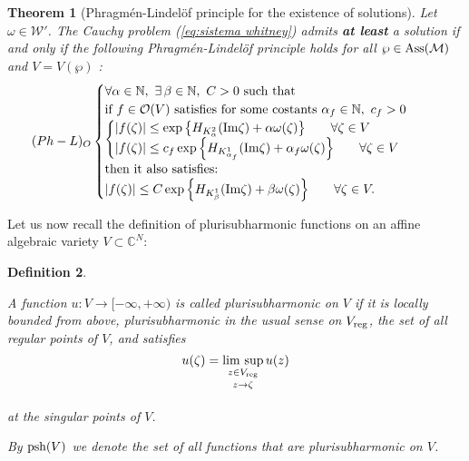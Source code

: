 \documentclass[twoside]{amsart}
\newtheorem{Th}{Theorem}[section]
\newtheorem{Def}[Th]{Definition}
\begin{document}
\begin{Th}[Phragm\'en-Lindel\"of principle for the existence
of solutions]
  \label{thm:3.4.8}
  Let $\omega\in{\mathcal{W}}'$.
The Cauchy pro\-blem (\ref{eq:sistema whitney}) admits \textbf{at least}
a solution if and only if the following Phragm\'en-Lindel\"{o}f principle
holds for all $\wp\in{\mathop{\rm Ass}\nolimits}({\mathcal{M}})$ and $V=V(\wp)$ :
\begin{align*}
(Ph-L)_{O} & 
\begin{cases}
\forall\alpha\in{\mathbb N},\,\,\exists\,\beta\in{\mathbb N},\,\,C>0\,\,\mbox{such that} 
& \mbox{}\\
\mbox{if }f\in{\mathcal O}(V)\,\,\mbox{satisfies for some costants }
\alpha_{f}\in{\mathbb N},\,\,c_{f}>0\\
\begin{cases}
|f(\zeta)|\leq\exp\left\{ H_{K_{\alpha}^{2}}({\mathop{\rm Im}\nolimits}\zeta)+\alpha\omega(\zeta)
\right\} \,\,\,\,\,\,\,\,\,\,\,\forall\zeta\in V\\
|f(\zeta)|\leq c_{f}\exp\left\{ H_{K_{\alpha_{f}}^{1}}({\mathop{\rm Im}\nolimits}\zeta)+\alpha_{f}
\omega(\zeta)\right\} \,\,\,\,\,\,\,\,\,\,\,\forall\zeta\in V
\end{cases}\\
\mbox{then it also satisfies:}\\
|f(\zeta)|\leq C\exp\left\{ H_{K_{\beta}^{1}}({\mathop{\rm Im}\nolimits}\zeta)+\beta\omega(\zeta)
\right\} \,\,\,\,\,\,\,\,\,\,\,\forall\zeta\in V.
\end{cases}
\end{align*}
\end{Th}

Let us now recall the definition of plurisubharmonic functions on
an affine algebraic variety $V\subset\mathbb{C}^{N}:$
\begin{Def}
\label{defpsh}
\begin{em}
A function $u:V\rightarrow[-\infty,+\infty)$
is called \emph{plurisubharmonic} on $V$ if it is locally bounded
from above, plurisubharmonic in the usual sense on $V_{{\rm reg}}$,
the set of all regular points of $V$, and satisfies 
\[
u(\zeta)=\underset{}{\underset{z\rightarrow\zeta}{\underset{z\in 
V_{{\rm reg}}}{\lim\,\sup}}}\,u(z)
\]
at the singular points of $V$.

By ${{\mathop{\rm psh}\nolimits}(V)}$ we denote the set of all functions that are plurisubharmonic
on $V$.
\end{em}
\end{Def}
\end{document}
